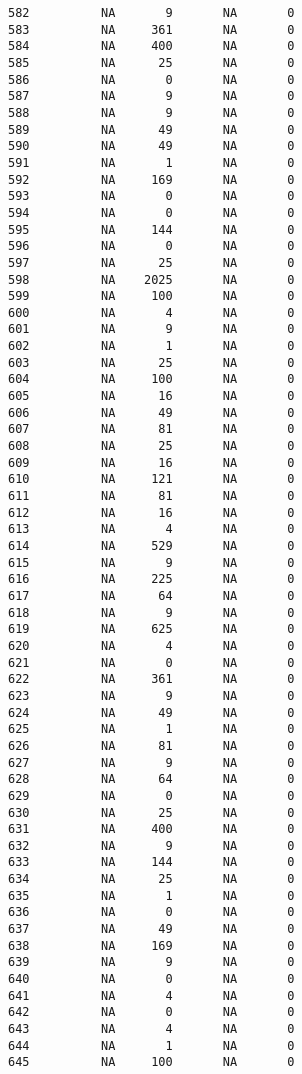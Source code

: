 \documentclass[
  letterpaper,
  DIV=11,
  numbers=noendperiod]{scrreprt}
\begin{document}
\begin{verbatim}
582          NA       9       NA       0
583          NA     361       NA       0
584          NA     400       NA       0
585          NA      25       NA       0
586          NA       0       NA       0
587          NA       9       NA       0
588          NA       9       NA       0
589          NA      49       NA       0
590          NA      49       NA       0
591          NA       1       NA       0
592          NA     169       NA       0
593          NA       0       NA       0
594          NA       0       NA       0
595          NA     144       NA       0
596          NA       0       NA       0
597          NA      25       NA       0
598          NA    2025       NA       0
599          NA     100       NA       0
600          NA       4       NA       0
601          NA       9       NA       0
602          NA       1       NA       0
603          NA      25       NA       0
604          NA     100       NA       0
605          NA      16       NA       0
606          NA      49       NA       0
607          NA      81       NA       0
608          NA      25       NA       0
609          NA      16       NA       0
610          NA     121       NA       0
611          NA      81       NA       0
612          NA      16       NA       0
613          NA       4       NA       0
614          NA     529       NA       0
615          NA       9       NA       0
616          NA     225       NA       0
617          NA      64       NA       0
618          NA       9       NA       0
619          NA     625       NA       0
620          NA       4       NA       0
621          NA       0       NA       0
622          NA     361       NA       0
623          NA       9       NA       0
624          NA      49       NA       0
625          NA       1       NA       0
626          NA      81       NA       0
627          NA       9       NA       0
628          NA      64       NA       0
629          NA       0       NA       0
630          NA      25       NA       0
631          NA     400       NA       0
632          NA       9       NA       0
633          NA     144       NA       0
634          NA      25       NA       0
635          NA       1       NA       0
636          NA       0       NA       0
637          NA      49       NA       0
638          NA     169       NA       0
639          NA       9       NA       0
640          NA       0       NA       0
641          NA       4       NA       0
642          NA       0       NA       0
643          NA       4       NA       0
644          NA       1       NA       0
645          NA     100       NA       0

\end{verbatim}
\end{document}
